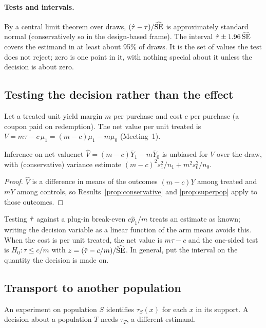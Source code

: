 \documentclass[11pt]{article}
\begin{document}
\paragraph{Tests and intervals.} By a central limit theorem over draws, $(\hat{\tau} - \tau)/\widehat{\operatorname{SE}}$ is
approximately standard normal (conservatively so in the design-based frame). The interval
$\hat{\tau} \pm 1.96\,\widehat{\operatorname{SE}}$ covers the estimand in at least about 95\% of draws. It is the set of values the
test does not reject; zero is one point in it, with nothing special about it unless the decision is about
zero.

\subsection{Testing the decision rather than the effect}

Let a treated unit yield margin $m$ per purchase and cost $c$ per purchase (a coupon paid on redemption).
The net value per unit treated is $V = m\tau - c\,\mu_1 = (m-c)\mu_1 - m\mu_0$ (Meeting~1).

\begin{prop}{Inference on net value}{net}
$\hat V = (m-c)\bar Y_1 - m\bar Y_0$ is unbiased for $V$ over the draw, with (conservative) variance
estimate $(m-c)^2 s_1^2/n_1 + m^2 s_0^2/n_0$.
\end{prop}
\begin{proof}
$\hat V$ is a difference in means of the outcomes $(m-c)Y$ among treated and $mY$ among controls, so
Results~\ref{prop:conservative} and \ref{prop:superpop} apply to those outcomes.
\end{proof}

Testing $\hat{\tau}$ against a plug-in break-even $c\hat p_1/m$ treats an estimate as known; writing the decision
variable as a linear function of the arm means avoids this. When the cost is per unit treated, the net value
is $m\tau - c$ and the one-sided test is $H_0: \tau \le c/m$ with $z = (\hat{\tau} - c/m)/\widehat{\operatorname{SE}}$. In general,
put the interval on the quantity the decision is made on.

\subsection{Transport to another population}

An experiment on population $S$ identifies $\tau_S(x)$ for each $x$ in its support. A decision about a
population $T$ needs $\tau_T$, a different estimand.
\end{document}
